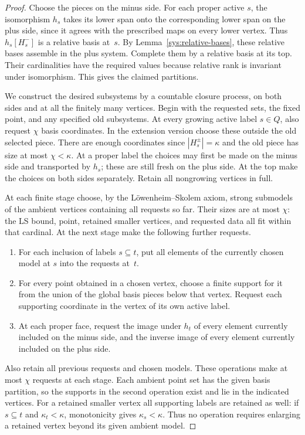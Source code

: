 \begin{proof}
Choose the pieces on the minus side.  For each proper active $s$,
the isomorphism $h_s$ takes its lower span onto the corresponding
lower span on the plus side, since it agrees with the prescribed
maps on every lower vertex.  Thus $h_s[H_s^-]$ is a relative basis
at~$s$.  By Lemma~\ref{sys:relative-bases}, these relative bases
assemble in the plus system.  Complete them by a relative basis
at its top.  Their cardinalities have the required values because
relative rank is invariant under isomorphism.  This gives the
claimed partitions.

We construct the desired subsystems by a countable closure
process, on both sides and at all the finitely many vertices.
Begin with the requested sets, the fixed point, and any specified
old subsystems.  At every growing active label $s\in Q$, also
request $\chi$ basis coordinates.  In the extension version
choose these outside the old selected piece.  There are enough
coordinates since $|H_s^\pm|=\kappa$ and the old piece has size
at most $\chi<\kappa$.  At a proper label the choices may first
be made on the minus side and transported by $h_s$; these are
still fresh on the plus side.  At the top make the choices on
both sides separately.  Retain all nongrowing vertices in full.

At each finite stage choose, by the L\"owenheim--Skolem axiom,
strong submodels of the ambient vertices containing all requests
so far.  Their sizes are at most $\chi$: the LS bound, point,
retained smaller vertices, and requested data all fit within that
cardinal.  At the next stage make the following further requests.
\begin{enumerate}
\item For each inclusion of labels $s\subseteq t$, put all
      elements of the currently chosen model at $s$ into the
      requests at~$t$.
\item For every point obtained in a chosen vertex, choose a finite
      support for it from the union of the global basis pieces
      below that vertex.  Request each supporting coordinate in
      the vertex of its own active label.
\item At each proper face, request the image under $h_t$ of every
      element currently included on the minus side, and the
      inverse image of every element currently included on the
      plus side.
\end{enumerate}
Also retain all previous requests and chosen models.  These
operations make at most $\chi$ requests at each stage.  Each
ambient point set has the given basis partition, so the supports
in the second operation exist and lie in the indicated vertices.
For a retained smaller vertex all supporting labels are retained
as well: if $s\subseteq t$ and $\kappa_t<\kappa$, monotonicity
gives $\kappa_s<\kappa$.  Thus no operation requires enlarging a
retained vertex beyond its given ambient model.


\end{proof}
